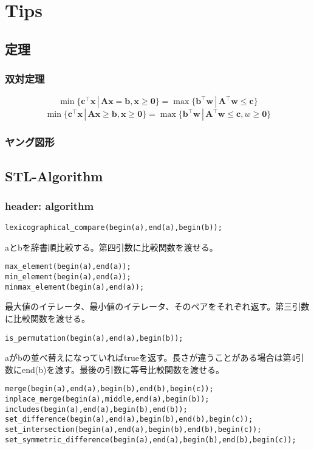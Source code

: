 \section{Tips}

\subsection{定理}
\subsubsection{双対定理}
\[ \min\{ \bm{c}^\top \bm{x} \, | \, \bm{A} \bm{x} = \bm{b}, \bm{x} \geq \bm{0} \}
= \max\{ \bm{b}^\top \bm{w} \, | \, \bm{A}^\top \bm{w} \leq \bm{c} \} \]
\[ \min\{ \bm{c}^\top \bm{x} \, | \, \bm{A} \bm{x} \geq \bm{b}, \bm{x} \geq \bm{0} \}
= \max\{ \bm{b}^\top \bm{w} \, | \, \bm{A}^\top \bm{w} \leq \bm{c}, w \geq \bm{0} \} \]

\subsubsection{ヤング図形}

\subsection{STL-Algorithm}
\subsubsection{header: algorithm}
\begin{lstlisting}[caption=辞書順比較]
lexicographical_compare(begin(a),end(a),begin(b));
\end{lstlisting}
aとbを辞書順比較する。第四引数に比較関数を渡せる。
\begin{lstlisting}[caption=最大値、最小値]
max_element(begin(a),end(a));
min_element(begin(a),end(a));
minmax_element(begin(a),end(a));
\end{lstlisting}
最大値のイテレータ、最小値のイテレータ、そのペアをそれぞれ返す。第三引数に比較関数を渡せる。
\begin{lstlisting}[caption=順列]
is_permutation(begin(a),end(a),begin(b));
\end{lstlisting}
aがbの並べ替えになっていればtrueを返す。長さが違うことがある場合は第4引数にend(b)を渡す。最後の引数に等号比較関数を渡せる。
\begin{lstlisting}[caption=ソート済みコンテナ操作]
merge(begin(a),end(a),begin(b),end(b),begin(c));
inplace_merge(begin(a),middle,end(a),begin(b));
includes(begin(a),end(a),begin(b),end(b));
set_difference(begin(a),end(a),begin(b),end(b),begin(c));
set_intersection(begin(a),end(a),begin(b),end(b),begin(c));
set_symmetric_difference(begin(a),end(a),begin(b),end(b),begin(c));
\end{lstlisting}
